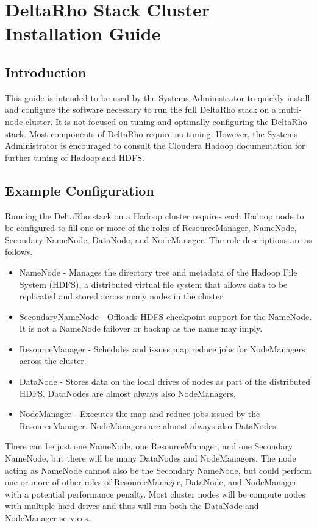 \section{DeltaRho Stack Cluster Installation Guide}
\subsection{Introduction}
This guide is intended to be used by the Systems Administrator to quickly
install and configure the software necessary to run the full DeltaRho
stack on a multi-node cluster.  It is not focused on tuning and optimally
configuring the DeltaRho stack.  Most components of DeltaRho require no
tuning.  However, the Systems Administrator is encouraged to consult the
Cloudera Hadoop documentation for further tuning of Hadoop and HDFS.


\subsection{Example Configuration}
Running the DeltaRho stack on a Hadoop cluster requires each Hadoop node to be configured to fill one or more of the roles of ResourceManager, NameNode, Secondary NameNode, DataNode, and NodeManager. The role descriptions are as follows.

\begin{itemize}
\item NameNode - Manages the directory tree and metadata of the Hadoop File System (HDFS), a distributed virtual file system that allows data to be replicated and stored across many nodes in the cluster.
\item SecondaryNameNode - Offloads HDFS checkpoint support for the NameNode.  It is not a NameNode failover or backup as the name may imply.
\item ResourceManager - Schedules and issues map reduce jobs for NodeManagers across the cluster.
\item DataNode - Stores data on the local drives of nodes as part of the distributed HDFS.  DataNodes are almost always also NodeManagers.
\item NodeManager - Executes the map and reduce jobs issued by the ResourceManager. NodeManagers are almost always also DataNodes.
\end{itemize}

There can be just one NameNode, one ResourceManager, and one Secondary
NameNode, but there will be many DataNodes and NodeManagers.  The node
acting as NameNode cannot also be the Secondary NameNode, but could
perform one or more of other roles of ResourceManager, DataNode, and
NodeManager with a potential  performance penalty.  Most cluster nodes
will be compute nodes with multiple hard drives and thus will run both
the DataNode and NodeManager services.

